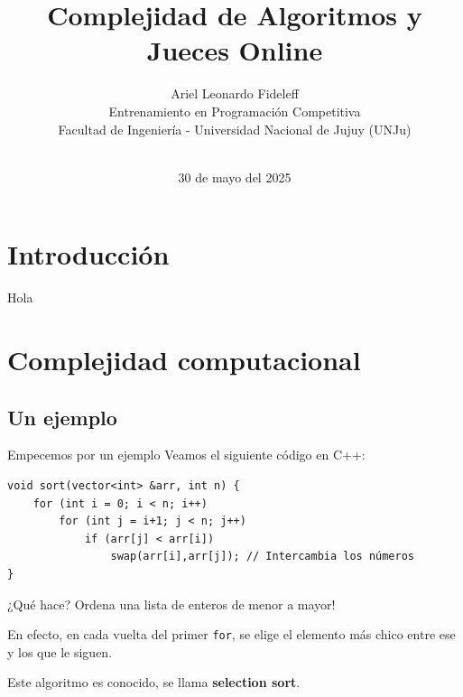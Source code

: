 \documentclass{beamer}
\title[Complejidad y Jueces Online]{Complejidad de Algoritmos y Jueces Online}
\author[Ariel Fideleff]{Ariel Leonardo Fideleff\\[2ex]\scriptsize{}Entrenamiento en Programación Competitiva\\Facultad de Ingeniería - Universidad Nacional de Jujuy (UNJu)}
\date{\\\vspace{-3ex}30 de mayo del 2025}
\begin{document}
    \frame{\titlepage}

    \begin{frame}
        \tableofcontents
    \end{frame}

    \section{Introducción}
    \begin{frame}
        Hola

    \end{frame}

    \section{Complejidad computacional}
    \frame{\tableofcontents[currentsection]}

    \subsection{Un ejemplo}

    \begin{frame}[fragile]{Empecemos por un ejemplo}
        \pause
        Veamos el siguiente código en C++:\vspace{10pt}

        \pause

        \begin{verbatim}
void sort(vector<int> &arr, int n) {
    for (int i = 0; i < n; i++)
        for (int j = i+1; j < n; j++)
            if (arr[j] < arr[i])
                swap(arr[i],arr[j]); // Intercambia los números
}
        \end{verbatim}

        \pause
        ¿Qué hace? \pause Ordena una lista de enteros de menor a mayor!\vspace{8pt}

        \pause

        En efecto, en cada vuelta del primer \texttt{for}, se elige el elemento más chico entre ese y los que le siguen.\pause
        
        Este algoritmo es conocido, se llama \textbf{selection sort}.
    \end{frame}
\end{document}
